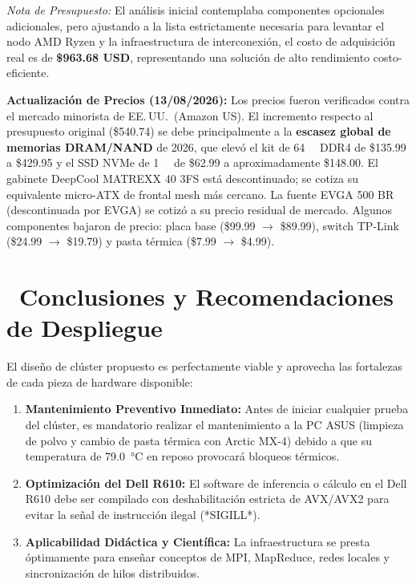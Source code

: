 \documentclass[11pt,a4paper]{article}
\newcommand{\iconotexto}[2]{\textcolor{cyanNeon}{\faIcon{#1}}~#2}
\begin{document}
\textit{Nota de Presupuesto:} El análisis inicial contemplaba componentes opcionales adicionales, pero ajustando a la lista estrictamente necesaria para levantar el nodo AMD Ryzen y la infraestructura de interconexión, el costo de adquisición real es de \textbf{\$963.68 USD}, representando una solución de alto rendimiento costo-eficiente.

\begin{cajaContenido}
\textbf{ Actualización de Precios (13/08/2026):} Los precios fueron verificados contra el mercado minorista de EE.\,UU.\ (Amazon US). El incremento respecto al presupuesto original (\$540.74) se debe principalmente a la \textbf{escasez global de memorias DRAM/NAND} de 2026, que elevó el kit de \SI{64}{\giga\byte} DDR4 de \$135.99 a \$429.95 y el SSD NVMe de \SI{1}{\tera\byte} de \$62.99 a aproximadamente \$148.00. El gabinete DeepCool MATREXX 40 3FS está descontinuado; se cotiza su equivalente micro-ATX de frontal mesh más cercano. La fuente EVGA 500 BR (descontinuada por EVGA) se cotizó a su precio residual de mercado. Algunos componentes bajaron de precio: placa base (\$99.99 $\rightarrow$ \$89.99), switch TP-Link (\$24.99 $\rightarrow$ \$19.79) y pasta térmica (\$7.99 $\rightarrow$ \$4.99).
\end{cajaContenido}

\section[Conclusiones y Recomendaciones de Despliegue]{\iconotexto{flag-checkered}{Conclusiones y Recomendaciones de Despliegue}}

El diseño de clúster propuesto es perfectamente viable y aprovecha las fortalezas de cada pieza de hardware disponible:
\begin{enumerate}
    \item \textbf{Mantenimiento Preventivo Inmediato:} Antes de iniciar cualquier prueba del clúster, es mandatorio realizar el mantenimiento a la PC ASUS (limpieza de polvo y cambio de pasta térmica con Arctic MX-4) debido a que su temperatura de \SI{79.0}{\celsius} en reposo provocará bloqueos térmicos.
    \item \textbf{Optimización del Dell R610:} El software de inferencia o cálculo en el Dell R610 debe ser compilado con deshabilitación estricta de AVX/AVX2 para evitar la señal de instrucción ilegal (*SIGILL*).
    \item \textbf{Aplicabilidad Didáctica y Científica:} La infraestructura se presta óptimamente para enseñar conceptos de MPI, MapReduce, redes locales y sincronización de hilos distribuidos.
\end{enumerate}
\end{document}
